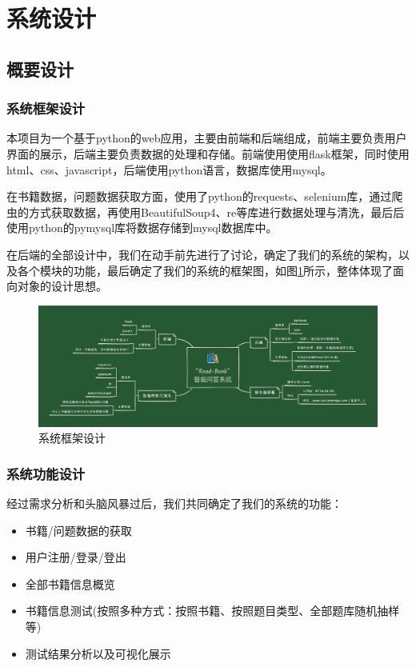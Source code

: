 \documentclass[twoside,11pt]{article}
\begin{document}


\section{系统设计}
\subsection{概要设计}
\subsubsection{系统框架设计}

本项目为一个基于python的web应用，主要由前端和后端组成，前端主要负责用户界面的展示，后端主要负责数据的处理和存储。前端使用使用flask框架，同时使用html、css、javascript，后端使用python语言，数据库使用mysql。

在书籍数据，问题数据获取方面，使用了python的requests、selenium库，通过爬虫的方式获取数据，再使用BeautifulSoup4、re等库进行数据处理与清洗，最后后使用python的pymysql库将数据存储到mysql数据库中。

在后端的全部设计中，我们在动手前先进行了讨论，确定了我们的系统的架构，以及各个模块的功能，最后确定了我们的系统的框架图，如图\ref{fig:fig1}所示，整体体现了面向对象的设计思想。

\begin{figure}[H]
    \centering
    \includegraphics[width=1\columnwidth]{figures/系统框架设计.jpg}
    \caption{系统框架设计}
    \label{fig:fig1}
\end{figure}
\subsubsection{系统功能设计}

经过需求分析和头脑风暴过后，我们共同确定了我们的系统的功能：
\begin{itemize}
    \item 书籍/问题数据的获取
    \item 用户注册/登录/登出
    \item 全部书籍信息概览
    \item 书籍信息测试(按照多种方式：按照书籍、按照题目类型、全部题库随机抽样等)
    \item 测试结果分析以及可视化展示
\end{itemize}
\end{document}
